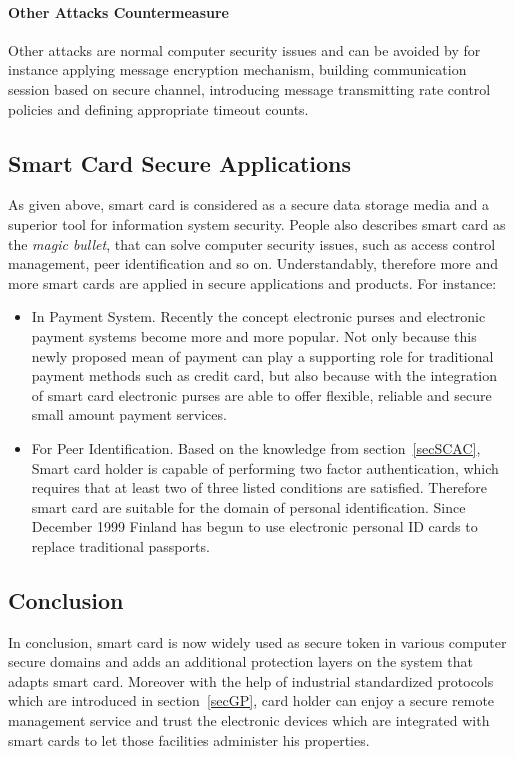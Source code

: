 \paragraph{Other Attacks Countermeasure}
Other attacks are normal computer security issues and can be avoided by for instance applying message encryption mechanism, building communication session based on secure channel, introducing message transmitting rate control policies and defining appropriate timeout counts.
\subsection{Smart Card Secure Applications}
As given above, smart card is considered as a secure data storage media and a superior tool for information system security. People also describes smart card as the \emph{magic bullet}, that can solve computer security issues, such as access control management, peer identification and so on. Understandably, therefore more and more smart cards are applied in secure applications and products. For instance:
\begin{itemize}
\item In Payment System. Recently the concept electronic purses and electronic payment systems become more and more popular. Not only because this newly proposed mean of payment can play a supporting role for traditional payment methods such as credit card, but also because with the integration of smart card electronic purses are able to offer flexible, reliable and secure  small amount payment services\cite{handbook}.
\item For Peer Identification. Based on the knowledge from section~\ref{secSCAC}, Smart card holder is  capable of performing two factor authentication\cite{smart_card_history}, which requires that at least two of three listed conditions are satisfied. Therefore smart card are suitable for the domain of personal identification. Since December 1999 Finland has begun to use electronic personal ID cards to replace traditional passports\cite{handbook}. 
\end{itemize}
\subsection{Conclusion}
In conclusion, smart card  is now widely used as secure token in various computer secure domains and adds an additional protection layers on the system that adapts smart card. Moreover with the help of industrial standardized protocols which are introduced in section~\ref{secGP}, card holder can enjoy a secure remote management service and trust the electronic devices which are integrated with smart cards to let those facilities administer his properties.  

